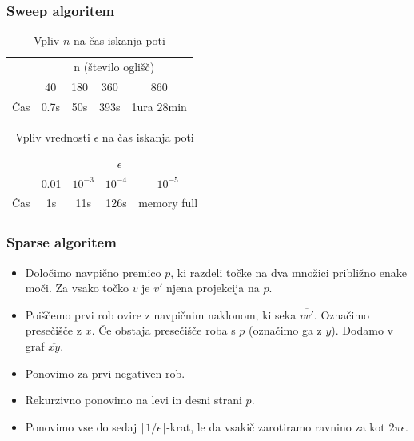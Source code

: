 \documentclass{beamer}
\begin{document}
\begin{frame}
    \frametitle{Sweep algoritem}
    \begin{table}[h]
        \centering
        \begin{tabular}{|c|c|c|c|c|}
            \hline
            & \multicolumn{4}{c|}{n (število oglišč)} \\
            \cline{2-5}
            & 40 & 180 & 360 & 860 \\
            \hline
            Čas & 0.7s & 50s &  393s &  1ura 28min\\
            \hline
        \end{tabular}
        \caption{Vpliv $n$ na čas iskanja poti}

    \end{table}
   
    \begin{table}[h]
        \centering
        \begin{tabular}{|c|c|c|c|c|}
            \hline
            & \multicolumn{4}{c|}{$\epsilon$} \\
            \cline{2-5}
            & 0.01 & $10^{-3}$ & $10^{-4}$ & $10^{-5}$ \\
            \hline
            Čas & 1s & 11s & 126s  &  memory full \\
            \hline
           
        \end{tabular}
        \caption{Vpliv vrednosti $\epsilon$ na čas iskanja poti}
    \end{table}
\end{frame}

\begin{frame}
    \frametitle{Sparse algoritem}
    
    \begin{itemize}

        \item Določimo navpično premico $p$, ki razdeli točke na dva množici približno enake moči.
        Za vsako točko $v$ je $v'$ njena projekcija na $p$. 
        \pause

        \item  Poiščemo prvi rob ovire z navpičnim naklonom, ki seka $\overline{vv'}$. Označimo presečišče z $x$. Če obstaja presečišče roba s $p$ (označimo ga z $y$). Dodamo v graf $\overline{xy}$.
        \pause
        \item  Ponovimo za prvi negativen rob.
        \pause
        \item  Rekurzivno ponovimo na levi in desni strani $p$.
        \pause
        \item Ponovimo vse do sedaj $\lceil 1/\epsilon\rceil$-krat, le da vsakič zarotiramo ravnino za kot $2\pi \epsilon$. 
    \end{itemize} 

\end{frame}
\end{document}
